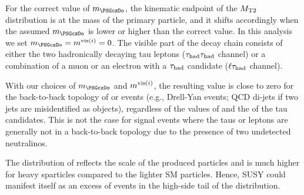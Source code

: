 For the correct value of $m_{\PSGczDo}$, the kinematic endpoint of the ${M_{\rm T2}}$ distribution is at the mass of the primary particle, and it shifts accordingly when the assumed $m_{\PSGczDo}$ is lower or higher than the correct value. In this analysis we set
$m_{\PSGczDo}=\mvisi=0$.
The visible part of the decay chain consists of either the two hadronically decaying tau leptons ($\tau_{\rm had} \tau_{\rm had}$ channel)
or a combination of a muon or an electron with a $\tau_{\rm had}$ candidate ($\ell\tau_{\rm had}$ channel).

With  our choices of $m_{\PSGczDo}$ and $m^{{\rm vis}(i)}$, the resulting \mttwo value is close to zero for the 
back-to-back topology of \tauTau or \leptonTau  
events (e.g., Drell-Yan events; QCD di-jets if two jets are misidentified as \Tau objects), regardless of the values of \MPT and the \PT of 
the tau candidates. This is not the case for signal events where the taus or leptons are generally not in a back-to-back topology due 
to the presence of two undetected neutralinos.

The distribution of \mttwo reflects the scale of the produced particles and is much higher for heavy sparticles
compared to the lighter SM particles. Hence, SUSY 
could manifest itself
as an excess of events in the high-side tail of the \mttwo distribution.
